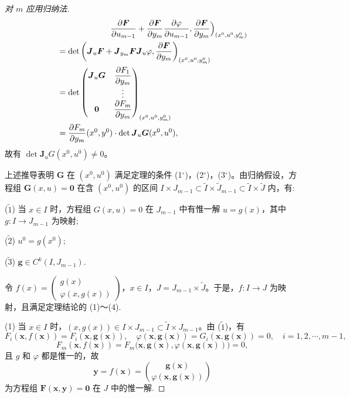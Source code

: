 \begin{proof}[对 $m$ 应用归纳法]
\begin{align*}
  &\hspace{6.5em}\frac{\partial \boldsymbol{F}}{\partial u_{m-1}} + \frac{\partial \boldsymbol{F}}{\partial y_{m}}\frac{\partial\varphi}{\partial u_{m-1}},\frac{\partial \boldsymbol{F}}{\partial y_{m}}\Bigr)_{(x^{0},u^{0},y_{m}^{0})} \\
  &= \det\left(\boldsymbol{J}_{u}\boldsymbol{F} + \boldsymbol{J}_{y_{m}}\boldsymbol{F}\boldsymbol{J}_{u}\varphi,\frac{\partial \boldsymbol{F}}{\partial y_{m}}\right)_{(x^{0},u^{0},y_{m}^{0})} \\
  &= \det\begin{pmatrix} \boldsymbol{J}_{u}\boldsymbol{G} & \dfrac{\partial F_{1}}{\partial y_{m}} \\ & \vdots \\ \boldsymbol{0} & \dfrac{\partial F_{m}}{\partial y_{m}} \end{pmatrix}_{(x^{0},u^{0},y_{m}^{0})} \\
  &= \frac{\partial F_{m}}{\partial y_{m}}(x^{0},y^{0}) \cdot \det \boldsymbol{J}_{u}\boldsymbol{G}(x^{0},u^{0}),
\end{align*}
故有 $\det \boldsymbol{J}_{u}G(x^{0},u^{0}) \neq 0$。

上述推导表明 $\boldsymbol{G}$ 在 $(x^{0},u^{0})$ 满足定理的条件 (1$^\circ$)，(2$^\circ$)，(3$^\circ$)。由归纳假设，方程组 $\boldsymbol{G}(x,u) = \boldsymbol{0}$ 在含 $(x^{0},u^{0})$ 的区间 $I \times J_{m-1} \subset \widetilde{I} \times \widetilde{J}_{m-1} \subset \widetilde{I} \times \widetilde{J}$ 内，有:

($\tilde{1}$) 当 $x \in I$ 时，方程组 $G(x,u) = 0$ 在 $J_{m-1}$ 中有惟一解 $u = g(x)$，其中 $g: I \to J_{m-1}$ 为映射;

($\tilde{2}$) $u^{0} = g(x^{0})$;

($\tilde{3}$) $\boldsymbol{g} \in C^{k}(I,J_{m-1})$.

令 $f(x) = \begin{pmatrix} g(x) \\ \varphi(x,g(x)) \end{pmatrix}$，$x \in I$，$J = J_{m-1} \times \widetilde{J}$。于是，$f: I \to J$ 为映射，且满足定理结论的 (1)～(4).

(1) 当 $x \in I$ 时，$(x,g(x)) \in I \times J_{m-1} \subset \widetilde{I} \times J_{m-1}$。由 ($\tilde{1}$)，有
\[
  F_{i}(\boldsymbol{x},f(\boldsymbol{x})) = F_{i}(\boldsymbol{x},\boldsymbol{g}(\boldsymbol{x})),\quad
  \varphi(\boldsymbol{x},\boldsymbol{g}(\boldsymbol{x})) = G_{i}(\boldsymbol{x},\boldsymbol{g}(\boldsymbol{x})) = 0,\quad i = 1,2,\cdots,m-1,
\]
\[
  F_{m}(\boldsymbol{x},f(\boldsymbol{x})) = F_{m}\bigl(\boldsymbol{x},\boldsymbol{g}(\boldsymbol{x}),\varphi(\boldsymbol{x},\boldsymbol{g}(\boldsymbol{x}))\bigr) = 0,
\]
且 $g$ 和 $\varphi$ 都是惟一的，故
\[
  \boldsymbol{y} = f(\boldsymbol{x}) = \binom{\boldsymbol{g}(\boldsymbol{x})}{\varphi(\boldsymbol{x},\boldsymbol{g}(\boldsymbol{x}))}
\]
为方程组 $\boldsymbol{F}(\boldsymbol{x},\boldsymbol{y}) = \boldsymbol{0}$ 在 $J$ 中的惟一解.


\end{proof}
